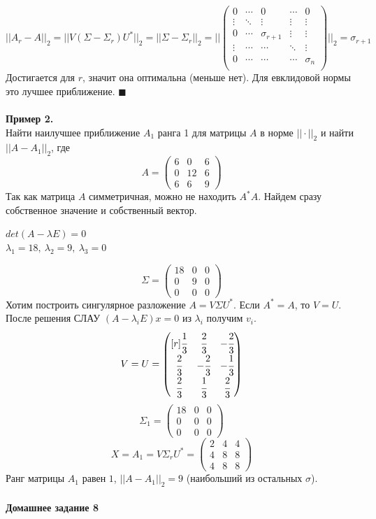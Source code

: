 \documentclass[12pt]{article}
\theoremstyle{definition}
\numberwithin{equation}{section}
\begin{document}
	\[||A_r-A||_2=||V(\Sigma-\Sigma_r)U^*||_2=||\Sigma-\Sigma_r||_2 = \Bigg| \Bigg|\begin{pmatrix}
	0 & \cdots & 0  & \cdots & 0\\
	\vdots & \ddots & \vdots & \vdots & \vdots\\
	0 & \cdots & \sigma_{r+1} &  \vdots & \vdots\\
	\vdots & \cdots & \cdots & \ddots & \vdots\\
	0 & \cdots & \cdots & \cdots & \sigma_n\\
	\end{pmatrix}\Bigg|\Bigg|_2=\sigma_{r+1}\]
	Достигается для $r$, значит она оптимальна (меньше нет). Для евклидовой нормы это лучшее приближение. $\blacksquare$\\ \\
	\textbf{Пример 2.}\\
	Найти наилучшее приближение $A_1$ ранга 1 для матрицы $A$ в норме $||\cdot||_2$ и найти $||A-A_1||_2$, где
	\[A = \begin{pmatrix}
	6 & 0 & 6\\
	0 & 12 & 6\\
	6 & 6 & 9
	\end{pmatrix}\]
	Так как матрица $A$ симметричная, можно не находить $A^*A$. Найдем сразу собственное значение и собственный вектор.
	\begin{center}
		$det(A-\lambda E)=0$\\
		$\lambda_1=18,~\lambda_2=9,~\lambda_3=0$\end{center}
	\[\Sigma = \begin{pmatrix}
	18 & 0 & 0\\
	0 & 9 & 0\\
	0 & 0 & 0
	\end{pmatrix}\]
	Хотим построить сингулярное разложение $A=V\Sigma U^*$. Если $A^*=A$, то $V=U$.\\
	После решения СЛАУ $(A-\lambda_i E)x=0$ из $\lambda_i$ получим $v_i$.
	\[V=U= \begin{pmatrix} [r]
	\cfrac{1}{3} & \cfrac{2}{3} & -\cfrac{2}{3}\\
	\cfrac{2}{3} & -\cfrac{2}{3} & -\cfrac{1}{3}\\
	\cfrac{2}{3} & \cfrac{1}{3} & \cfrac{2}{3}
	\end{pmatrix}\]
	\[\Sigma_1 = \begin{pmatrix}
	18 & 0 & 0\\
	0 & 0 & 0\\
	0 & 0 & 0
	\end{pmatrix}\]
	\[X=A_1 = V\Sigma_r U^*=\begin{pmatrix}
	2 & 4 & 4\\
	4 & 8 & 8\\
	4 & 8 & 8
	\end{pmatrix}\]
	Ранг матрицы $A_1$ равен $1$, $||A-A_1||_2=9$ (наибольший из остальных $\sigma$).\\ \\
	\noindent \textbf{Домашнее задание 8}
	
\end{document}
